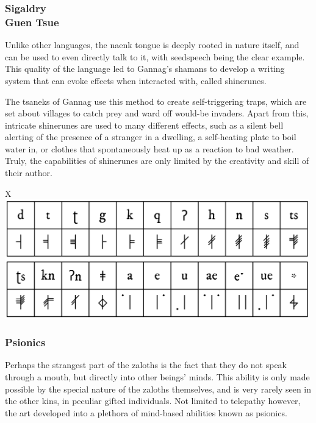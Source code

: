 \subsubsection{Sigaldry\\ \small{Guen Tsue}}
Unlike other languages, the naenk tongue is deeply rooted in nature itself, and can be used to even directly talk to it, with seedspeech being the clear example.
This quality of the language led to Gannag's shamans to develop a writing system that can evoke effects when interacted with, called shinerunes.

The tsaneks of Gannag use this method to create self-triggering traps, which are set about villages to catch prey and ward off would-be invaders.
Apart from this, intricate shinerunes are used to many different effects, such as a silent bell alerting of the presence of a stranger in a dwelling, a self-heating plate to boil water in, or clothes that spontaneously heat up as a reaction to bad weather.
Truly, the capabilities of shinerunes are only limited by the creativity and skill of their author.

\begin{table}[t]%
    \begin{DndTable}[width=\linewidth, header=\centering Knaenese Alphabet]{X}
        \centering
        \includegraphics[width=0.99\textwidth]{01yuadrem/img/23knaenese_sample.png}
    \end{DndTable}
\end{table}

\subsubsection{Psionics} %
Perhaps the strangest part of the zaloths is the fact that they do not speak through a mouth, but directly into other beings' minds.
This ability is only made possible by the special nature of the zaloths themselves, and is very rarely seen in the other kins, in peculiar gifted individuals.
Not limited to telepathy however, the art developed into a plethora of mind-based abilities known as psionics.

